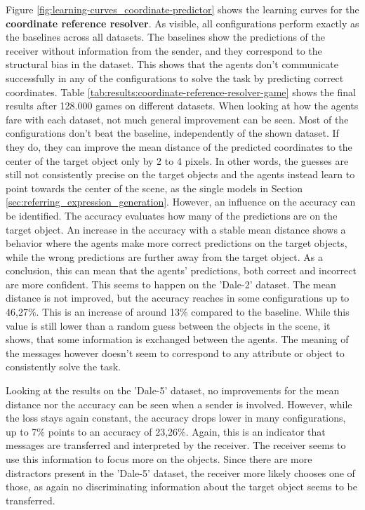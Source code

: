 Figure \ref{fig:learning-curves_coordinate-predictor} shows the learning curves for the \textbf{coordinate reference resolver}.
As visible, all configurations perform exactly as the baselines across all datasets.
The baselines show the predictions of the receiver without information from the sender, and they correspond to the structural bias in the dataset.
This shows that the agents don't communicate successfully in any of the configurations to solve the task by predicting correct coordinates.
Table \ref{tab:results:coordinate-reference-resolver-game} shows the final results after 128.000 games on different datasets.
When looking at how the agents fare with each dataset, not much general improvement can be seen.
Most of the configurations don't beat the baseline, independently of the shown dataset.
If they do, they can improve the mean distance of the predicted coordinates to the center of the target object only by 2 to 4 pixels.
In other words, the guesses are still not consistently precise on the target objects and the agents instead learn to point towards the center of the scene, as the single models in Section \ref{sec:referring_expression_generation}.
However, an influence on the accuracy can be identified.
The accuracy evaluates how many of the predictions are on the target object.
An increase in the accuracy with a stable mean distance shows a behavior where the agents make more correct predictions on the target objects, while the wrong predictions are further away from the target object.
As a conclusion, this can mean that the agents' predictions, both correct and incorrect are more confident.
This seems to happen on the 'Dale-2' dataset.
The mean distance is not improved, but the accuracy reaches in some configurations up to 46,27\%.
This is an increase of around 13\% compared to the baseline.
While this value is still lower than a random guess between the objects in the scene, it shows, that some information is exchanged between the agents.
The meaning of the messages however doesn't seem to correspond to any attribute or object to consistently solve the task.

Looking at the results on the 'Dale-5' dataset, no improvements for the mean distance nor the accuracy can be seen when a sender is involved.
However, while the loss stays again constant, the accuracy drops lower in many configurations, up to 7\% points to an accuracy of 23,26\%.
Again, this is an indicator that messages are transferred and interpreted by the receiver.
The receiver seems to use this information to focus more on the objects.
Since there are more distractors present in the 'Dale-5' dataset, the receiver more likely chooses one of those, as again no discriminating information about the target object seems to be transferred.

